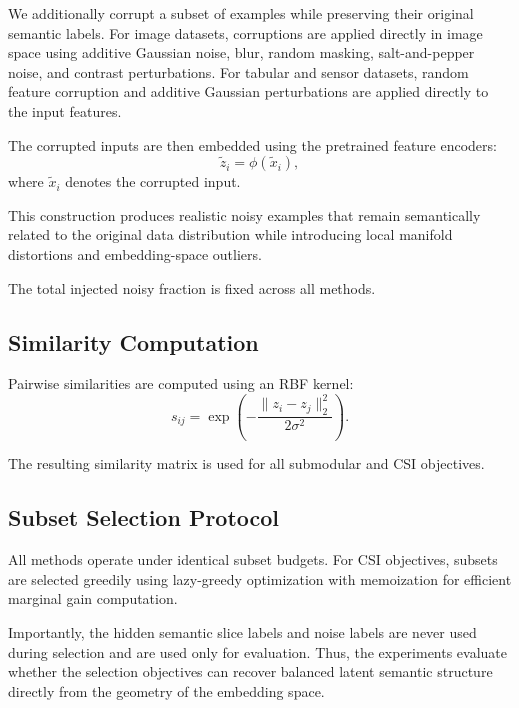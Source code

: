 \documentclass[11pt]{article}
\begin{document}
We additionally corrupt a subset of examples while preserving their original semantic labels. For image datasets, corruptions are applied directly in image space using additive Gaussian noise, blur, random masking, salt-and-pepper noise, and contrast perturbations. For tabular and sensor datasets, random feature corruption and additive Gaussian perturbations are applied directly to the input features.

The corrupted inputs are then embedded using the pretrained feature encoders:
\[
\tilde z_i
=
\phi(\tilde x_i),
\]
where $\tilde x_i$ denotes the corrupted input.

This construction produces realistic noisy examples that remain semantically related to the original data distribution while introducing local manifold distortions and embedding-space outliers.

The total injected noisy fraction is fixed across all methods.
\subsection{Similarity Computation}

Pairwise similarities are computed using an RBF kernel:
\[
s_{ij}
=
\exp\left(
-\frac{\|z_i-z_j\|_2^2}{2\sigma^2}
\right).
\]

The resulting similarity matrix is used for all submodular and CSI objectives.

\subsection{Subset Selection Protocol}

All methods operate under identical subset budgets. For CSI objectives, subsets are selected greedily using lazy-greedy optimization with memoization for efficient marginal gain computation.

Importantly, the hidden semantic slice labels and noise labels are never used during selection and are used only for evaluation. Thus, the experiments evaluate whether the selection objectives can recover balanced latent semantic structure directly from the geometry of the embedding space.
\end{document}
